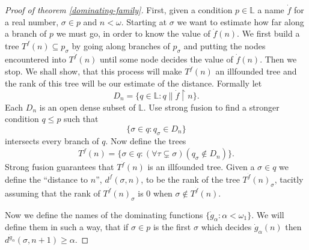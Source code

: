 \documentclass[a4paper,11pt,oneside]{mybook}
\theoremstyle{theorem}
\theoremstyle{example}
\begin{document}
\begin{proof}[Proof of theorem \ref{dominating-family}]
First, given a condition $p\in\mathbb{L}$ a name $\dot{f}$ for a real number, $\sigma\in p$ and $n<\omega$. Starting at $\sigma$ we want to estimate how far along a branch of $p$ we must go, in order to know the value of $\dot{f}(n)$. We first build a tree $T^{\dot{f}}(n)\subseteq p_\sigma$ by going along branches of $p_\sigma$ and putting the nodes encountered into $T^{\dot{f}}(n)$ until some node decides the value of $\dot{f}(n)$. Then we stop. We shall show, that this process will make $T^{\dot{f}}(n)$ an illfounded tree and the rank of this tree will be our estimate of the distance. Formally let
$$D_n=\{q\in\mathbb{L}:q\parallel \dot{f}\upharpoonright n\}.$$
Each $D_n$ is an open dense subset of $\mathbb{L}$. Use strong fusion to find a stronger condition $q\leq p$ such that
$$
\{\sigma\in q:q_\sigma\in D_n\}
$$
intersects every branch of $q$. Now define the trees
$$
T^{\dot{f}}(n)=\{\sigma\in q:(\forall\tau\subsetneq\sigma)(q_\sigma\not\in D_n)\}.
$$
Strong fusion guarantees that $T^{\dot{f}}(n)$ is an illfounded tree. Given a $\sigma\in q$ we define the ``distance to $n$'', $d^{\dot{f}}(\sigma,n)$, to be the rank of the tree $T^{\dot{f}}(n)_\sigma$, tacitly assuming that the rank of $T^{\dot{f}}(n)_\sigma$ is $0$ when $\sigma\not\in T^{\dot{f}}(n)$.

Now we define the names of the dominating functions $\{\dot{g}_\alpha:\alpha<\omega_1\}$. We will define them in such a way, that if $\sigma\in p$ is the first
$\sigma$ which decides $\dot{g}_\alpha(n)$ then $d^{\dot{g}_\alpha}(\sigma,n+1)\geq\alpha$.


\end{proof}
\end{document}
